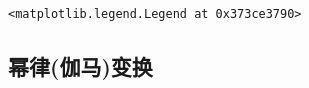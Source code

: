 \documentclass[11pt]{article}
\makeatletter
\newcommand{\boxspacing}{\kern\kvtcb@left@rule\kern\kvtcb@boxsep}
\newcommand{\prompt}[4]{
	{\ttfamily\llap{{\color{#2}[#3]:\hspace{3pt}#4}}\vspace{-\baselineskip}}
}
\makeatother
\begin{document}
            \begin{tcolorbox}[breakable, size=fbox, boxrule=.5pt, pad at break*=1mm, opacityfill=0]
\begin{Verbatim}[commandchars=\\\{\}]
<matplotlib.legend.Legend at 0x373ce3790>
\end{Verbatim}
\end{tcolorbox}
        
    \begin{center}
    \end{center}
    
    \subsection{幂律(伽马)变换} 
\end{document}
